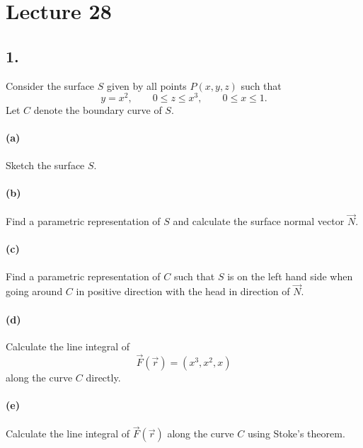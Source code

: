 \section*{Lecture 28}

\subsection*{1.} Consider the surface $S$ given by all points $P(x,y,z)$ such that
\[ 
y = x^2, \qquad 0 \leq z \leq x^3, \qquad 0 \leq x \leq 1
.\]
Let $C$ denote the boundary curve of $S$.

\paragraph{(a)} Sketch the surface $S$.

\paragraph{(b)} Find a parametric representation of $S$ and calculate the surface normal vector $\Vec{N}$.

\paragraph{(c)} Find a parametric representation of $C$ such that $S$ is on the left hand side when going around $C$ in positive direction with the head in direction of $\Vec{N}$.

\paragraph{(d)} Calculate the line integral of
\[ 
\Vec{F} \left( \Vec{r} \right) = \left( x^3, x^2, x \right) 
\]
along the curve $C$ directly.

\paragraph{(e)} Calculate the line integral of $\Vec{F} \left( \Vec{r} \right) $ along the curve $C$ using Stoke's theorem.
